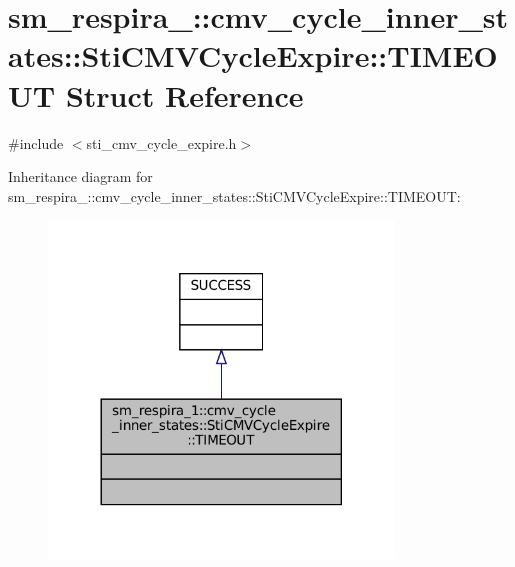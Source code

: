 \hypertarget{structsm__respira__1_1_1cmv__cycle__inner__states_1_1StiCMVCycleExpire_1_1TIMEOUT}{}\section{sm\+\_\+respira\+\_\+:\+:cmv\+\_\+cycle\+\_\+inner\+\_\+states\+:\+:Sti\+C\+M\+V\+Cycle\+Expire\+:\+:T\+I\+M\+E\+O\+UT Struct Reference}
\label{structsm__respira__1_1_1cmv__cycle__inner__states_1_1StiCMVCycleExpire_1_1TIMEOUT}


{\ttfamily \#include $<$sti\+\_\+cmv\+\_\+cycle\+\_\+expire.\+h$>$}



Inheritance diagram for sm\+\_\+respira\+\_\+:\+:cmv\+\_\+cycle\+\_\+inner\+\_\+states\+:\+:Sti\+C\+M\+V\+Cycle\+Expire\+:\+:T\+I\+M\+E\+O\+UT\+:
\nopagebreak
\begin{figure}[H]
\begin{center}
\leavevmode
\includegraphics[width=260pt]{structsm__respira__1_1_1cmv__cycle__inner__states_1_1StiCMVCycleExpire_1_1TIMEOUT__inherit__graph}
\end{center}
\end{figure}


